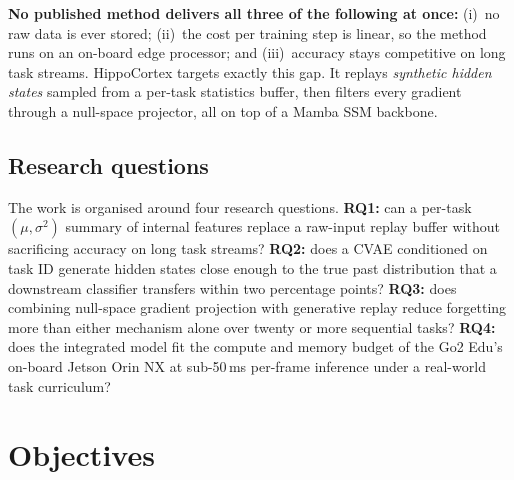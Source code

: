 \documentclass[11pt,a4paper]{article}
\begin{document}
\textbf{No published method delivers all three of the following at once:} (i)~no raw data is ever stored; (ii)~the cost per training step is linear, so the method runs on an on-board edge processor; and (iii)~accuracy stays competitive on long task streams. HippoCortex targets exactly this gap. It replays \emph{synthetic hidden states} sampled from a per-task statistics buffer, then filters every gradient through a null-space projector, all on top of a Mamba SSM backbone.

\subsection{Research questions}
The work is organised around four research questions.
\textbf{RQ1:} can a per-task $(\mu,\sigma^{2})$ summary of internal features replace a raw-input replay buffer without sacrificing accuracy on long task streams?
\textbf{RQ2:} does a CVAE conditioned on task ID generate hidden states close enough to the true past distribution that a downstream classifier transfers within two percentage points?
\textbf{RQ3:} does combining null-space gradient projection with generative replay reduce forgetting more than either mechanism alone over twenty or more sequential tasks?
\textbf{RQ4:} does the integrated model fit the compute and memory budget of the Go2 Edu's on-board Jetson Orin NX at sub-50\,ms per-frame inference under a real-world task curriculum?

\section{Objectives}
\end{document}
